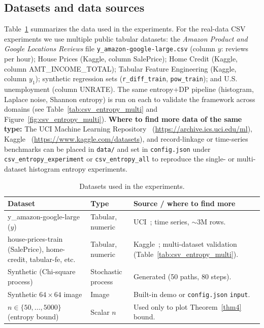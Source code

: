 \documentclass[journal,transmag]{IEEEtran}
\begin{document}
\subsection{Datasets and data sources}
Table~\ref{tab:datasets} summarizes the data used in the experiments. For the real-data CSV experiments we use multiple public tabular datasets: the \emph{Amazon Product and Google Locations Reviews} file \texttt{y\_amazon-google-large.csv} \cite{adler2026amazon} (column $y$: reviews per hour); House Prices (Kaggle, column SalePrice); Home Credit (Kaggle, column AMT\_INCOME\_TOTAL); Tabular Feature Engineering (Kaggle, column $y_1$); synthetic regression sets (\texttt{r\_diff\_train}, \texttt{pow\_train}); and U.S. unemployment (column UNRATE). The same entropy+DP pipeline (histogram, Laplace noise, Shannon entropy) is run on each to validate the framework across domains (see Table~\ref{tab:csv_entropy_multi} and Figure~\ref{fig:csv_entropy_multi}). \textbf{Where to find more data of the same type:} The UCI Machine Learning Repository~\cite{uci2023} (\url{https://archive.ics.uci.edu/ml}), Kaggle~\cite{kaggle} (\url{https://www.kaggle.com/datasets}), and record-linkage or time-series benchmarks can be placed in \texttt{data/} and set in \texttt{config.json} under \texttt{csv\_entropy\_experiment} or \texttt{csv\_entropy\_all} to reproduce the single- or multi-dataset histogram entropy experiments.

\begin{table}[!h]
\centering
\caption{Datasets used in the experiments.}
\label{tab:datasets}
\begin{tabular}{llp{4.2cm}}
\hline
\textbf{Dataset} & \textbf{Type} & \textbf{Source / where to find more} \\
\hline
y\_amazon-google-large ($y$) & Tabular, numeric & UCI~\cite{adler2026amazon}; time series, $\sim$3M rows. \\
house-prices-train (SalePrice), home-credit, tabular-fe, etc. & Tabular, numeric & Kaggle~\cite{kaggle}; multi-dataset validation (Table~\ref{tab:csv_entropy_multi}). \\
Synthetic (Chi-square process) & Stochastic process & Generated (50 paths, 80 steps). \\
Synthetic $64\times 64$ image & Image & Built-in demo or \texttt{config.json} \texttt{input}. \\
$n \in \{50,\ldots,5000\}$ (entropy bound) & Scalar $n$ & Used only to plot Theorem~\ref{thm4} bound. \\
\hline
\end{tabular}
\end{table}
\end{document}
